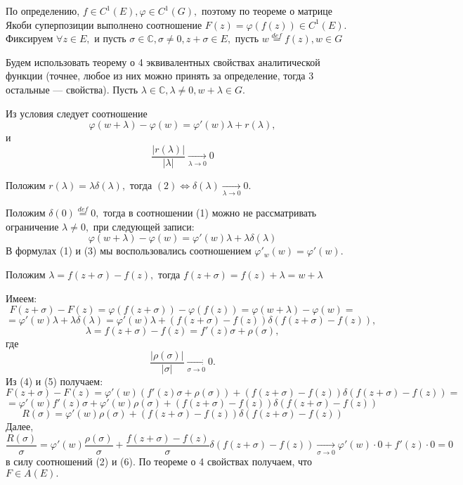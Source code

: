 \documentclass[main]{subfiles}
\begin{document}
\begin{longProof}
     По определению, $f\in C^1(E), \varphi\in C^1(G),$ поэтому по теореме о матрице Якоби суперпозиции
      выполнено соотношение $F(z)=\varphi(f(z))\in C^1(E).$ Фиксируем $\forall z\in E,$ и пусть $\sigma\in\mathbb{C}, \sigma\neq 0, z+\sigma\in E,$ 
      пусть $w\overset{def}{=}f(z), w\in G$

Будем использовать теорему о 4 эквивалентных свойствах аналитической функции
 (точнее, любое из них можно принять за определение, тогда 3 остальные --- свойства).
  Пусть $\lambda\in\mathbb{C}, \lambda\neq 0, w+\lambda\in G.$

Из условия следует соотношение \[ \varphi(w+\lambda)-\varphi(w)=\varphi'(w)\lambda+r(\lambda),\tag{1} \]
и \[\frac{|r(\lambda)|}{|\lambda|}\underset{\lambda\rightarrow 0}{\rightarrow} 0\tag{2}\]

Положим $r(\lambda)=\lambda\delta(\lambda),$ тогда $(2)\Leftrightarrow \delta(\lambda)\underset{\lambda\rightarrow 0}{\rightarrow} 0.$

Положим $\delta(0)\overset{def}{=}0,$ тогда в соотношении (1) можно не рассматривать ограничение $\lambda\neq 0,$ при следующей записи:
\[ \varphi(w+\lambda)-\varphi(w)=\varphi'(w)\lambda+\lambda\delta(\lambda)\tag{3} \]
В формулах (1) и (3) мы воспользовались соотношением $\varphi'_w(w)=\varphi'(w).$

Положим $\lambda=f(z+\sigma)-f(z),$ тогда $f(z+\sigma)=f(z)+\lambda=w+\lambda$

Имеем:
\[ F(z+\sigma)-F(z)=\varphi(f(z+\sigma))-\varphi(f(z))=\varphi(w+\lambda)-\varphi(w)= \]
\[ =\varphi'(w)\lambda+\lambda\delta(\lambda)=\varphi'(w)\lambda+(f(z+\sigma)-f(z))\delta(f(z+\sigma)-f(z)),\tag{4}\]
\[ \lambda=f(z+\sigma)-f(z)=f'(z)\sigma+\rho(\sigma),\tag{5} \]
где \[\frac{|\rho(\sigma)|}{|\sigma|}\underset{\sigma\rightarrow 0}{\rightarrow} 0.\tag{6}\]
Из (4) и (5) получаем:
\[ F(z+\sigma)-F(z)=\varphi'(w)(f'(z)\sigma+\rho(\sigma))+(f(z+\sigma)-f(z))\delta(f(z+\sigma)-f(z))= \]
\[ =\varphi'(w)f'(z)\sigma+\varphi'(w)\rho(\sigma)+(f(z+\sigma)-f(z))\delta(f(z+\sigma)-f(z))\tag{7} \]
\[ R(\sigma)= \varphi'(w)\rho(\sigma)+(f(z+\sigma)-f(z))\delta(f(z+\sigma)-f(z)) \]
Далее, \[\frac{R(\sigma)}{\sigma}=\varphi'(w)\frac{\rho(\sigma)}{\sigma}+\frac{f(z+\sigma)-f(z)}{\sigma}\delta(f(z+\sigma)-f(z))\underset{\sigma\rightarrow 0}{\rightarrow} \varphi'(w)\cdot 0+f'(z)\cdot 0=0\tag{8}\]
в силу соотношений (2) и (6). По теореме о 4 свойствах получаем, что $F\in A(E).$ 
\end{longProof}
\end{document}
